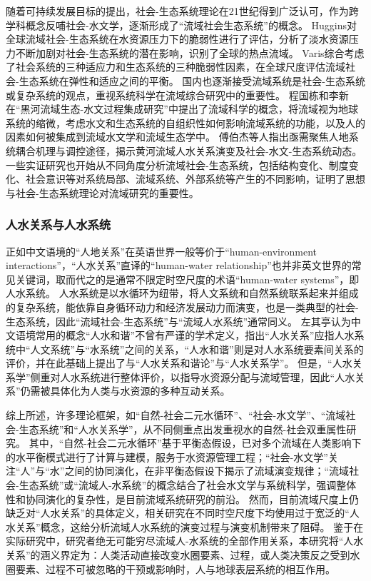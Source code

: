 随着可持续发展目标的提出，社会-生态系统理论在21世纪得到广泛认可，作为跨学科概念反哺社会-水文学，逐渐形成了“流域社会生态系统”的概念。
Huggins对全球流域社会-生态系统在水资源压力下的脆弱性进行了评估，分析了淡水资源压力不断加剧对社会-生态系统的潜在影响，识别了全球的热点流域\cite{huggins2022}。
Varis综合考虑了社会系统的三种适应力和生态系统的三种脆弱性因素，在全球尺度评估流域社会-生态系统在弹性和适应之间的平衡\cite{varis2019}。
国内也逐渐接受流域系统是社会-生态系统或复杂系统的观点，重视系统科学在流域综合研究中的重要性。
程国栋和李新在“黑河流域生态-水文过程集成研究”中提出了流域科学的概念，将流域视为地球系统的缩微，考虑水文和生态系统的自组织性如何影响流域系统的功能，以及人的因素如何被集成到流域水文学和流域生态学中\cite{cheng2015}。
傅伯杰等人指出亟需聚焦人地系统耦合机理与调控途径，揭示黄河流域人水关系演变及社会-水文-生态系统动态\cite{fu2021a}。
一些实证研究也开始从不同角度分析流域社会-生态系统，包括结构变化\cite{song2022}、制度变化\cite{wang2019d}、社会意识\cite{liu2023}等对系统局部、流域系统、外部系统等产生的不同影响，证明了思想与社会-生态系统理论对流域研究的重要性。

\subsubsection{人水关系与人水系统}

正如中文语境的“人地关系”在英语世界一般等价于“human-environment interactions”\cite{li2016c, liu2023}，“人水关系”直译的“human-water relationship”也并非英文世界的常见关键词，取而代之的是通常不限定时空尺度的术语“human-water systems”，即人水系统\cite{konar2019}。
人水系统是以水循环为纽带，将人文系统和自然系统联系起来并组成的复杂系统，能依靠自身循环动力和经济发展动力而演变\cite{zuo2007}，也是一类典型的社会-生态系统，因此“流域社会-生态系统”与“流域人水系统”通常同义\cite{yu2020}。
左其亭认为中文语境常用的概念“人水和谐”不曾有严谨的学术定义\cite{zuo2007}，指出“人水关系”应指人水系统中“人文系统”与“水系统”之间的关系，“人水和谐”则是对人水系统要素间关系的评价，并在此基础上提出了与“人水关系和谐论”与“人水关系学”\cite{zuoqiting2022, zuo2016a}。
但是，“人水关系学”侧重对人水系统进行整体评价，以指导水资源分配与流域管理，因此“人水关系”仍需被具体化为人类与水资源的多种互动关系\cite{zuo2016, zuo2020a}。

综上所述，许多理论框架，如“自然-社会二元水循环”、“社会-水文学”、“流域社会-生态系统”和“人水关系学”，从不同侧重点出发重视水的自然-社会双重属性研究。
其中，“自然-社会二元水循环”基于平衡态假设，已对多个流域在人类影响下的水平衡模式进行了计算与建模，服务于水资源管理工程；“社会-水文学”关注“人”与“水”之间的协同演化，在非平衡态假设下揭示了流域演变规律；“流域社会-生态系统”或“流域人-水系统”的概念结合了社会水文学与系统科学，强调整体性和协同演化的复杂性，是目前流域系统研究的前沿。
然而，目前流域尺度上仍缺乏对“人水关系”的具体定义，相关研究在不同时空尺度下均使用过于宽泛的“人水关系”概念，这给分析流域人水系统的演变过程与演变机制带来了阻碍。
鉴于在实际研究中，研究者绝无可能穷尽流域人-水系统的全部作用关系，本研究将“人水关系”的涵义界定为：人类活动直接改变水圈要素、过程，或人类决策反之受到水圈要素、过程不可被忽略的干预或影响时，人与地球表层系统的相互作用。
